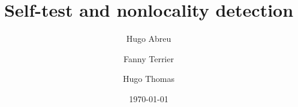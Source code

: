 

\pgfplotsset{compat=1.18}
\title{Self-test and nonlocality detection}

\author[$\dag$]{Hugo Abreu}
\author[$\dag$]{Fanny Terrier}
\author[$\dag$]{Hugo Thomas}

\date{\today}


\maketitle
\thispagestyle{firststyle}
















% 
% 
\printbibliography




%
